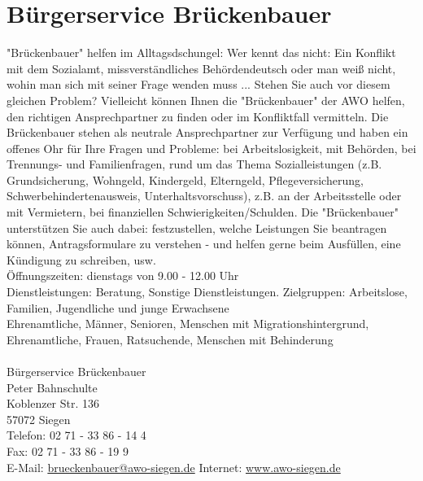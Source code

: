 \section{Bürgerservice Brückenbauer}
"Brückenbauer" helfen im Alltagsdschungel: Wer kennt das nicht: Ein Konflikt mit dem Sozialamt, missverständliches Behördendeutsch oder man weiß nicht, wohin man sich mit seiner Frage wenden muss ... Stehen Sie auch vor diesem gleichen Problem? Vielleicht können Ihnen die "Brückenbauer" der AWO helfen, den richtigen Ansprechpartner zu finden oder im Konfliktfall vermitteln. Die Brückenbauer stehen als neutrale Ansprechpartner zur Verfügung und haben ein offenes Ohr für Ihre Fragen und Probleme:  bei 
Arbeitslosigkeit, mit Behörden, bei Trennungs- und Familienfragen, rund um das Thema Sozialleistungen (z.B. Grundsicherung, 
Wohngeld, Kindergeld, Elterngeld, Pflegeversicherung, Schwerbehindertenausweis, Unterhaltsvorschuss), z.B. an der Arbeitsstelle oder mit Vermietern, bei finanziellen Schwierigkeiten/Schulden. Die "Brückenbauer" unterstützen Sie auch dabei: festzustellen, welche Leistungen Sie beantragen können, Antragsformulare zu verstehen - und helfen gerne beim Ausfüllen, eine Kündigung zu schreiben, usw. \\
Öffnungszeiten: dienstags von 9.00 - 12.00 Uhr \\
Dienstleistungen: Beratung, Sonstige Dienstleistungen. Zielgruppen: Arbeitslose, Familien, Jugendliche und junge Erwachsene\\ Ehrenamtliche, Männer, Senioren, Menschen mit Migrationshintergrund, Ehrenamtliche, Frauen, Ratsuchende, Menschen mit Behinderung\\ 
\\
Bürgerservice Brückenbauer \\
Peter Bahnschulte \\
Koblenzer Str. 136\\
57072 Siegen \\
Telefon: 02 71 - 33 86 - 14 4 \\
Fax: 02 71 - 33 86 - 19 9 \\ 
E-Mail: \href{mailto:brueckenbauer@awo-siegen.de}{brueckenbauer@awo-siegen.de}
Internet: \href{www.awo-siegen.de}{www.awo-siegen.de}  